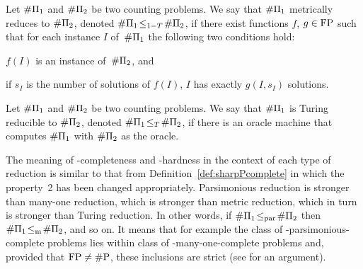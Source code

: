 \begin{definition}[Krentel]
    Let $\textnormal{\#}\Pi_1$ \!and $\textnormal{\#}\Pi_2$ \!be two counting problems.
	We say that $\textnormal{\#}\Pi_1$ \!metrically reduces to $\textnormal{\#}\Pi_2$, denoted $\textnormal{\#}\Pi_1\!\le_{1-T}\!\textnormal{\#}\Pi_2$, if there exist functions $f$, $g\in\textnormal{FP}$ such that for each instance $I$ \!of \,$\textnormal{\#}\Pi_1$ \!the following two conditions hold:
	\begin{Enumerate}
		\item $f(I)$ is an instance of \,$\textnormal{\#}\Pi_2$, and
		\item if $s_I$ is the number of solutions of $f(I)$, $I$ has exactly $g(I,s_I)$ solutions.
	\end{Enumerate}
\end{definition}

\begin{definition}[Valiant]
    Let $\textnormal{\#}\Pi_1$ \!and $\textnormal{\#}\Pi_2$ \!be two counting problems.
	We say that $\textnormal{\#}\Pi_1$ \!is Turing reducible to $\textnormal{\#}\Pi_2$, denoted $\textnormal{\#}\Pi_1\!\le_T\!\textnormal{\#}\Pi_2$, if there is an oracle machine that computes $\textnormal{\#}\Pi_1$ \!with $\textnormal{\#}\Pi_2$ \!as the oracle.
\end{definition}

The meaning of \sharpPclass-completeness and \sharpPclass-hardness in the context of each type of reduction is similar to that from Definition~\ref{def:sharpPcomplete} in which the property~2 has been changed appropriately.
Parsimonious reduction is stronger than many-one reduction, which is stronger than metric reduction, which in turn is stronger than Turing reduction.
In other words, if $\textnormal{\#}\Pi_1\!\le_\textnormal{par}\!\textnormal{\#}\Pi_2$ then $\textnormal{\#}\Pi_1\!\le_\textnormal{m}\!\textnormal{\#}\Pi_2$, and so on.
It means that for example the class of \sharpPclass-parsimonious-complete problems lies within class of \sharpPclass-many-one-complete problems and, provided that $\textnormal{FP}\ne\textnormal{\#P}$, these inclusions are strict (see \cite{faliszewski11} for an argument).
